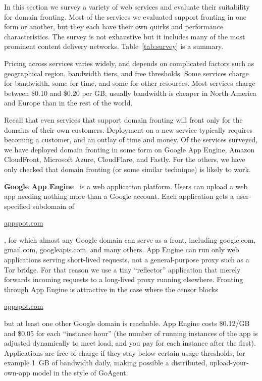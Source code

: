 \documentclass{sig-alternate}
\def\urll#1{\begin{NoHyper}\url{#1}\end{NoHyper}}
\begin{document}
In this section we survey a variety of web services and evaluate
their suitability for domain fronting.
Most of the services we evaluated support fronting in one form or another,
but they each have their own quirks and performance characteristics.
The survey is not exhaustive but it includes many of the most prominent
content delivery networks.
Table~\ref{tab:survey} is a summary.

Pricing across services varies widely,
and depends on complicated factors such as geographical region,
bandwidth tiers, and free thresholds.
Some services charge for bandwidth,
some for time, and some for other resources.
Most services charge between \$0.10 and \$0.20 per GB;
usually bandwidth is cheaper in North America and Europe
than in the rest of the world.

Recall that even services that support domain fronting
will front only for the domains of their own customers.
Deployment on a new service typically requires becoming a customer,
and an outlay of time and money.
Of the services surveyed, we have deployed domain fronting in some form
on Google App Engine, Amazon CloudFront, Microsoft Azure, CloudFlare, and Fastly.
For the others, we have only checked that domain fronting
(or some similar technique)
is likely to work.

\smallskip

\textbf{Google App Engine}~\cite{googleappengine}
is a web application platform.
Users can upload a web app needing nothing more than a Google account.
Each application gets a user-specified subdomain of \urll{appspot.com},
for which almost any Google domain can serve as a front,
including google.com, gmail.com, googleapis.com, and many others.
App Engine can run only web applications serving short-lived requests,
not a general-purpose proxy such as a Tor bridge.
For that reason we use a tiny ``reflector'' application
that merely forwards incoming requests to a long-lived proxy running elsewhere.
Fronting through App Engine is attractive in the case where the censor blocks
\urll{appspot.com} but at least one
other Google domain is reachable.
App Engine costs \$0.12/GB and \$0.05 for each ``instance hour''
(the number of running instances of the app is adjusted dynamically
to meet load, and you pay for each instance after the first).
Applications are free of charge if they stay below certain
usage thresholds, for example 1~GB of bandwidth daily,
making possible a distributed, upload-your-own-app model
in the style of GoAgent.
\end{document}
